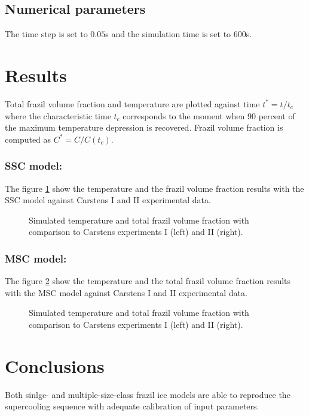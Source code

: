 \subsection{Numerical parameters}

The time step is set to $0.05$s and the simulation time is set to $600$s.

\section{Results}

Total frazil volume fraction and temperature are plotted against time $t^*=t/t_c$ 
where the characteristic time $t_c$ corresponds to the
moment when $90$ percent of the maximum temperature depression is recovered.
Frazil volume fraction is computed as $C^*=C/C(t_c)$.

\subsubsection{SSC model:}

The figure \ref{fig:carstens_monoclass}
show the temperature and the frazil volume fraction results with the SSC 
model against Carstens I and II experimental data.

\begin{figure}[H]
    \begin{center}
    \end{center}
    \caption{Simulated temperature and total frazil volume fraction with comparison to Carstens experiments I (left) and II (right).}
    \label{fig:carstens_monoclass}
\end{figure}

\subsubsection{MSC model:}

The figure \ref{fig:carstens_multiclass}
show the temperature and the total frazil volume fraction results with the MSC
model against Carstens I and II experimental data.

\begin{figure}[H]
    \begin{center}
    \end{center}
    \caption{Simulated temperature and total frazil volume fraction with comparison to Carstens experiments I (left) and II (right).}
    \label{fig:carstens_multiclass}
\end{figure}

\section{Conclusions}

Both sinlge- and multiple-size-class frazil ice models are able to reproduce the supercooling sequence with adequate calibration of input parameters.

\renewcommand{\labelitemi}{\textbullet}
